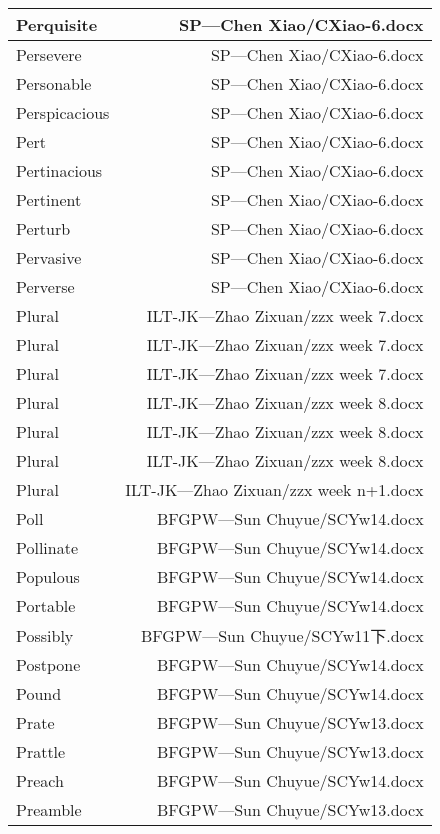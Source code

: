 \documentclass{article}
\begin{document}
\begin{center}
\begin{longtable}{|l|r|}
Perquisite  &  SP---Chen Xiao/CXiao-6.docx\\  
\hline
Persevere  &  SP---Chen Xiao/CXiao-6.docx\\  
\hline
Personable  &  SP---Chen Xiao/CXiao-6.docx\\  
\hline
Perspicacious  &  SP---Chen Xiao/CXiao-6.docx\\  
\hline
Pert  &  SP---Chen Xiao/CXiao-6.docx\\  
\hline
Pertinacious  &  SP---Chen Xiao/CXiao-6.docx\\  
\hline
Pertinent  &  SP---Chen Xiao/CXiao-6.docx\\  
\hline
Perturb  &  SP---Chen Xiao/CXiao-6.docx\\  
\hline
Pervasive  &  SP---Chen Xiao/CXiao-6.docx\\  
\hline
Perverse  &  SP---Chen Xiao/CXiao-6.docx\\  
\hline
Plural  &  ILT-JK---Zhao Zixuan/zzx week 7.docx\\  
\hline
Plural  &  ILT-JK---Zhao Zixuan/zzx week 7.docx\\  
\hline
Plural  &  ILT-JK---Zhao Zixuan/zzx week 7.docx\\  
\hline
Plural  &  ILT-JK---Zhao Zixuan/zzx week 8.docx\\  
\hline
Plural  &  ILT-JK---Zhao Zixuan/zzx week 8.docx\\  
\hline
Plural  &  ILT-JK---Zhao Zixuan/zzx week 8.docx\\  
\hline
Plural  &  ILT-JK---Zhao Zixuan/zzx week n+1.docx\\  
\hline
Poll  &  BFGPW---Sun Chuyue/SCYw14.docx\\  
\hline
Pollinate  &  BFGPW---Sun Chuyue/SCYw14.docx\\  
\hline
Populous  &  BFGPW---Sun Chuyue/SCYw14.docx\\  
\hline
Portable  &  BFGPW---Sun Chuyue/SCYw14.docx\\  
\hline
Possibly  &  BFGPW---Sun Chuyue/SCYw11下.docx\\  
\hline
Postpone  &  BFGPW---Sun Chuyue/SCYw14.docx\\  
\hline
Pound  &  BFGPW---Sun Chuyue/SCYw14.docx\\  
\hline
Prate  &  BFGPW---Sun Chuyue/SCYw13.docx\\  
\hline
Prattle  &  BFGPW---Sun Chuyue/SCYw13.docx\\  
\hline
Preach  &  BFGPW---Sun Chuyue/SCYw14.docx\\  
\hline
Preamble  &  BFGPW---Sun Chuyue/SCYw13.docx\\  

\end{longtable}
\end{center}
\end{document}

